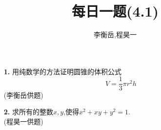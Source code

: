 \documentclass[UTF8]{ctexart}
\title{每日一题(4.1)}
\author{李衡岳,程昊一}
\begin{document}
\maketitle
\begin{itemize}
\item[\textbf{1.}]用纯数学的方法证明圆锥的体积公式
\[V=\frac{1}{3}\pi r^2h\]
{(李衡岳供题)}
\item[\textbf{2.}]求所有的整数$x,y$,使得$x^2+xy+y^2=1$.\\
{(程昊一供题)}


\end{itemize}
\end{document}
